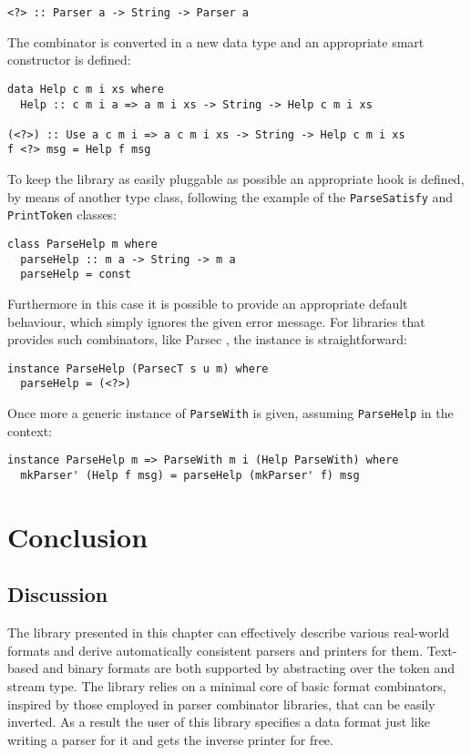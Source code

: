 \documentclass[../Thesis.tex]{subfiles}
\begin{document}
\begin{verbatim}
<?> :: Parser a -> String -> Parser a
\end{verbatim}	

	The combinator is converted in a new data type and
	an appropriate smart constructor is defined:
\begin{verbatim}
data Help c m i xs where
  Help :: c m i a => a m i xs -> String -> Help c m i xs

(<?>) :: Use a c m i => a c m i xs -> String -> Help c m i xs
f <?> msg = Help f msg
\end{verbatim}
	
	To keep the library as easily pluggable as possible an appropriate
	hook is defined, by means of another type class, following the
	example of the \texttt{ParseSatisfy} and \texttt{PrintToken} classes:

\begin{verbatim}
class ParseHelp m where
  parseHelp :: m a -> String -> m a
  parseHelp = const
\end{verbatim}
	Furthermore in this case it is possible to provide an appropriate
	default behaviour, which simply ignores the given error message.
	For libraries that provides such combinators, like Parsec \cite{Parsec},
	the instance is straightforward:
	
\begin{verbatim}
instance ParseHelp (ParsecT s u m) where
  parseHelp = (<?>)
\end{verbatim}

	Once more a generic instance of \texttt{ParseWith} is given,
	assuming \texttt{ParseHelp} in the context:
	
\begin{verbatim}
instance ParseHelp m => ParseWith m i (Help ParseWith) where
  mkParser' (Help f msg) = parseHelp (mkParser' f) msg
\end{verbatim}
	
\section{Conclusion}
\label{sec:FormatConclusion}
\subsection{Discussion}
\label{subsec:Discussion}
The library presented in this chapter can effectively describe various real-world formats and derive automatically consistent parsers and printers 
for them.
Text-based and binary formats are both supported by abstracting
over the token and stream type.
The library relies on a minimal core of basic format combinators, inspired
by those employed in parser combinator libraries, that can be easily inverted.
As a result the user of this library specifies a data format just like writing a parser for it and gets the inverse printer for free.
\end{document}
